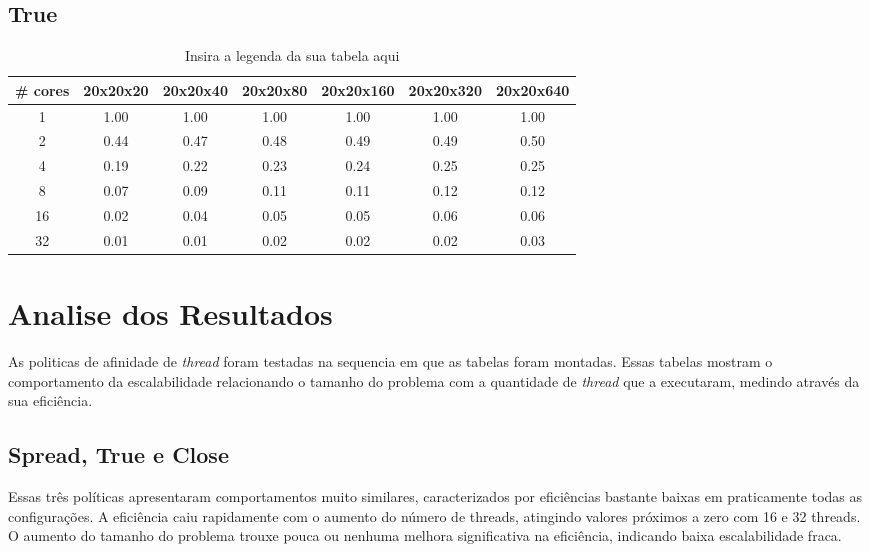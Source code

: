 \documentclass[a4paper, 12pt]{article}
\begin{document}
	\subsection{True}
	\begin{table}[h!]
		\centering
		\begin{tabular}{|c|c|c|c|c|c|c|}
			\hline
			\textbf{\# cores} & \textbf{20x20x20} & \textbf{20x20x40} & \textbf{20x20x80} & \textbf{20x20x160} & \textbf{20x20x320} & \textbf{20x20x640} \\ \hline
			1                 & 1.00              & 1.00              & 1.00              & 1.00               & 1.00               & 1.00               \\ \hline
			2                 & 0.44              & 0.47              & 0.48              & 0.49               & 0.49               & 0.50               \\ \hline
			4                 & 0.19              & 0.22              & 0.23              & 0.24               & 0.25               & 0.25               \\ \hline
			8                 & 0.07              & 0.09              & 0.11              & 0.11               & 0.12               & 0.12               \\ \hline
			16                & 0.02              & 0.04              & 0.05              & 0.05               & 0.06               & 0.06               \\ \hline
			32                & 0.01              & 0.01              & 0.02              & 0.02               & 0.02               & 0.03               \\ \hline
		\end{tabular}
		\caption{Insira a legenda da sua tabela aqui}
		\label{tab:minha_tabela}
	\end{table}	
	
	\FloatBarrier
		
	\section{Analise dos Resultados}
	
	As politicas de afinidade de \textit{thread} foram testadas na sequencia em que as tabelas foram montadas. Essas tabelas mostram o comportamento da escalabilidade relacionando o tamanho do problema com a quantidade de \textit{thread} que a executaram, medindo através da sua eficiência.
	
	\subsection{Spread, True e Close}
	Essas três políticas apresentaram comportamentos muito similares, caracterizados por eficiências bastante baixas em praticamente todas as configurações. A eficiência caiu rapidamente com o aumento do número de threads, atingindo valores próximos a zero com 16 e 32 threads. O aumento do tamanho do problema trouxe pouca ou nenhuma melhora significativa na eficiência, indicando baixa escalabilidade fraca.
	
\end{document}
